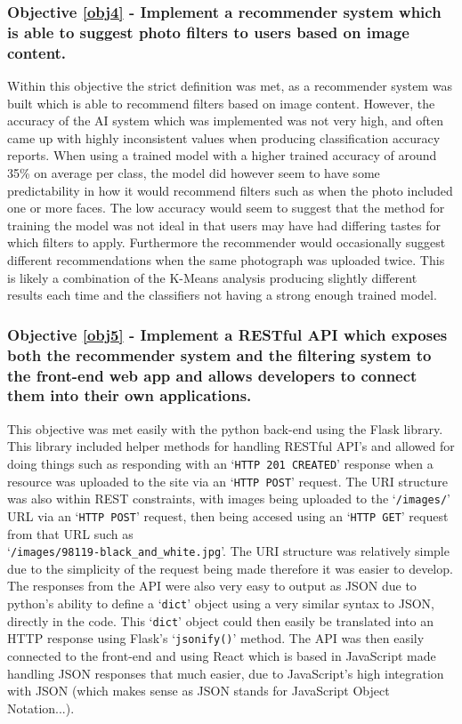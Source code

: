 \documentclass[a4paper,12pt]{report}
\begin{document}
  \subsubsection{Objective \ref{obj4} - Implement a recommender system which is able to suggest photo filters to users based on image content.}
    Within this objective the strict definition was met, as a recommender system was built which is able to recommend filters based on image content. However, the accuracy of the AI system which was implemented was not very high, and often came up with highly inconsistent values when producing classification accuracy reports. When using a trained model with a higher trained accuracy of around 35\% on average per class, the model did however seem to have some predictability in how it would recommend filters such as when the photo included one or more faces. The low accuracy would seem to suggest that the method for training the model was not ideal in that users may have had differing tastes for which filters to apply. Furthermore the recommender would occasionally suggest different recommendations when the same photograph was uploaded twice. This is likely a combination of the K-Means analysis producing slightly different results each time and the classifiers not having a strong enough trained model.

  \subsubsection{Objective \ref{obj5} - Implement a RESTful API which exposes both the recommender system and the filtering system to the front-end web app and allows developers to connect them into their own applications.}
    This objective was met easily with the python back-end using the Flask library. This library included helper methods for handling RESTful API's and allowed for doing things such as responding with an ‘\texttt{HTTP 201 CREATED}’ response when a resource was uploaded to the site via an ‘\texttt{HTTP POST}’ request. The URI structure was also within REST constraints, with images being uploaded to the ‘\texttt{/images/}’ URL via an ‘\texttt{HTTP POST}’ request, then being accesed using an ‘\texttt{HTTP GET}’ request from that URL such as\\ ‘\texttt{/images/98119-black\_and\_white.jpg}’. The URI structure was relatively simple due to the simplicity of the request being made therefore it was easier to develop. The responses from the API were also very easy to output as JSON due to python's ability to define a ‘\texttt{dict}’ object using a very similar syntax to JSON, directly in the code. This ‘\texttt{dict}’ object could then easily be translated into an HTTP response using Flask's ‘\texttt{jsonify()}’ method. The API was then easily connected to the front-end and using React which is based in JavaScript made handling JSON responses that much easier, due to JavaScript's high integration with JSON (which makes sense as JSON stands for JavaScript Object Notation...).
\end{document}
